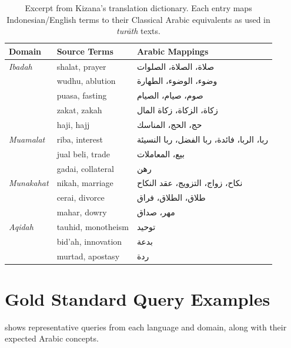 \documentclass[preprint,12pt,numbers]{elsarticle}
\newcommand{\ar}[1]{{\arabicfont #1}}
\begin{document}
\begin{table}[t]
\centering
\caption{Excerpt from Kizana's translation dictionary. Each entry maps Indonesian/English terms to their Classical Arabic equivalents as used in \textit{tur\={a}th} texts.}
\label{tab:dict-excerpt}
\small
\begin{tabular}{llp{5cm}}
\toprule
Domain & Source Terms & Arabic Mappings \\
\midrule
\textit{Ibadah} & shalat, prayer & \ar{صلاة، الصلاة، الصلوات} \\
& wudhu, ablution & \ar{وضوء، الوضوء، الطهارة} \\
& puasa, fasting & \ar{صوم، صيام، الصيام} \\
& zakat, zakah & \ar{زكاة، الزكاة، زكاة المال} \\
& haji, hajj & \ar{حج، الحج، المناسك} \\
\midrule
\textit{Muamalat} & riba, interest & \ar{ربا، الربا، فائدة، ربا الفضل، ربا النسيئة} \\
& jual beli, trade & \ar{بيع، المعاملات} \\
& gadai, collateral & \ar{رهن} \\
\midrule
\textit{Munakahat} & nikah, marriage & \ar{نكاح، زواج، التزويج، عقد النكاح} \\
& cerai, divorce & \ar{طلاق، الطلاق، فراق} \\
& mahar, dowry & \ar{مهر، صداق} \\
\midrule
\textit{Aqidah} & tauhid, monotheism & \ar{توحيد} \\
& bid'ah, innovation & \ar{بدعة} \\
& murtad, apostasy & \ar{ردة} \\
\bottomrule
\end{tabular}
\end{table}

\section{Gold Standard Query Examples}
\label{appendix:queries}

 shows representative queries from each language and domain, along with their expected Arabic concepts.
\end{document}
